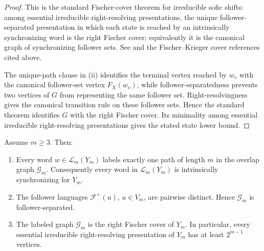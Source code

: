 \begin{proof}
This is the standard Fischer-cover theorem for irreducible sofic shifts:
among essential irreducible right-resolving presentations, the unique
follower-separated presentation in which each state is reached by an
intrinsically synchronizing word is the right Fischer cover; equivalently it
is the canonical graph of synchronizing follower sets. See
\cite[Theorem~3.3.18]{LindMarcus1995} and the Fischer--Krieger cover
references cited above.

The unique-path clause in (ii) identifies the terminal vertex reached by
$w_v$ with the canonical follower-set vertex $F_X(w_v)$, while
follower-separatedness prevents two vertices of $G$ from representing the
same follower set. Right-resolvingness gives the canonical transition rule on
these follower sets. Hence the standard theorem identifies $G$ with the right
Fischer cover. Its minimality among essential irreducible right-resolving
presentations gives the stated state lower bound.
\end{proof}

\begin{theorem}
\label{thm:fischer-cover-stabilized-image}
Assume $m\ge3$.  Then:
\begin{enumerate}[label=(\roman*),leftmargin=*,itemsep=2pt]
  \item Every word $w\in\mathcal L_m(Y_m)$ labels exactly one path of length
  $m$ in the overlap graph $\mathcal G_m$. Consequently every word in
  $\mathcal L_m(Y_m)$ is intrinsically synchronizing for $Y_m$.
  \item The follower languages $\mathcal F^+(u)$, $u\in V_m$, are pairwise
  distinct.  Hence $\mathcal G_m$ is follower-separated.
  \item The labeled graph $\mathcal G_m$ is the right Fischer cover of $Y_m$.
  In particular, every essential irreducible right-resolving presentation of
  $Y_m$ has at least $2^{m-1}$ vertices.
\end{enumerate}
\end{theorem}

